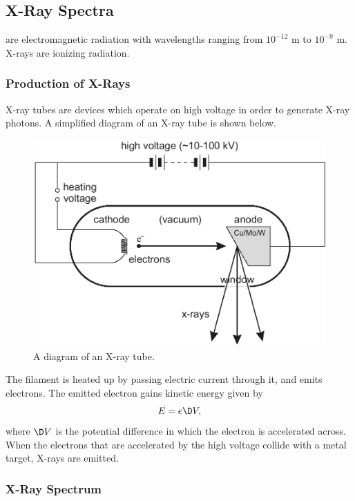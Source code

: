 \subsection{X-Ray Spectra}

 are electromagnetic radiation with wavelengths ranging from $10^{-12}$ m to $10^{-9}$ m. X-rays are ionizing radiation.

\subsubsection{Production of X-Rays}

X-ray tubes are devices which operate on high voltage in order to generate X-ray photons. A simplified diagram of an X-ray tube is shown below.

\begin{figure}[H]
    \centering
    \includegraphics{media/X-Ray Tube.png}
    \caption{A diagram of an X-ray tube.\protect\footnotemark}
\end{figure}

The filament is heated up by passing electric current through it, and emits electrons. The emitted electron gains kinetic energy given by \[E = e \D V,\] where $\D V$ is the potential difference in which the electron is accelerated across. When the electrons that are accelerated by the high voltage collide with a metal target, X-rays are emitted.

\subsubsection{X-Ray Spectrum}

